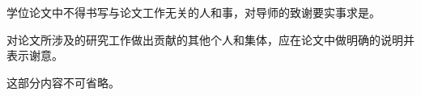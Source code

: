 
\begin{acknowledgement}

学位论文中不得书写与论文工作无关的人和事，对导师的致谢要实事求是。

对论文所涉及的研究工作做出贡献的其他个人和集体，应在论文中做明确的说明并表示谢意。

这部分内容不可省略。

\end{acknowledgement}


